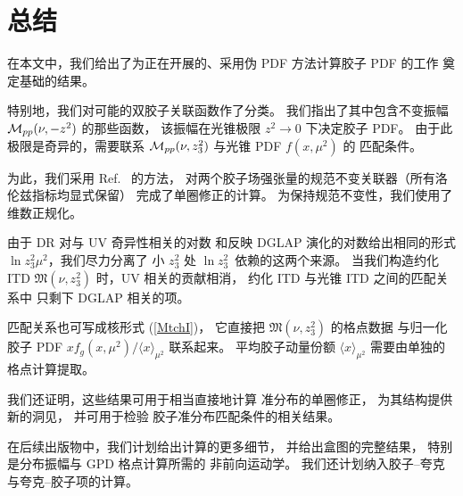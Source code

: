\section{总结}

在本文中，我们给出了为正在开展的、采用伪 PDF 方法计算胶子 PDF 的工作
奠定基础的结果。

特别地，我们对可能的双胶子关联函数作了分类。
我们指出了其中包含不变振幅 ${\cal M}_{pp}(\nu,-z^2)$ 的那些函数，
该振幅在光锥极限 $z^2 \to 0$ 下决定胶子 PDF。
由于此极限是奇异的，需要联系 ${\cal M}_{pp}(\nu,z_3^2)$ 与光锥 PDF $f(x,\mu^2)$ 的
匹配条件。

为此，我们采用 Ref.~\cite{Balitsky:1987bk} 的方法，
对两个胶子场强张量的规范不变关联器（所有洛伦兹指标均显式保留）
完成了单圈修正的计算。
为保持规范不变性，我们使用了维数正规化。

由于 DR 对与 UV 奇异性相关的对数
和反映 DGLAP 演化的对数给出相同的形式 $\ln z_3^2 \mu^2$，我们尽力分离了
小 $z_3^2$ 处 \mbox{$\ln z_3^2$ 依赖}的这两个来源。
当我们构造约化 ITD ${\mathfrak M}(\nu,z_3^2)$ 时，UV 相关的贡献相消，
约化 ITD 与光锥 ITD 之间的匹配关系中
只剩下 DGLAP 相关的项。

匹配关系也可写成核形式 (\ref{MtchI})，
它直接把 ${\mathfrak M}(\nu,z_3^2)$ 的格点数据
与归一化胶子 PDF $x f_g (x,\mu^2)/ {\langle x \rangle_{\mu^2}}$ 联系起来。
平均胶子动量份额 ${\langle x \rangle_{\mu^2}}$
需要由单独的格点计算提取。

我们还证明，这些结果可用于相当直接地计算
准分布的单圈修正，
为其结构提供新的洞见，
并可用于检验
胶子准分布匹配条件的相关结果。

在后续出版物中，我们计划给出计算的更多细节，
并给出盒图的完整结果，
特别是分布振幅与 GPD 格点计算所需的
非前向运动学。
我们还计划纳入胶子--夸克
与夸克--胶子项的计算。
